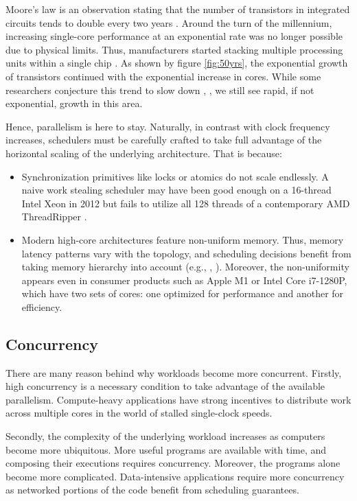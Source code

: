 \documentclass[12pt,a4paper,twoside]{report}
\begin{document}
Moore's law is an observation stating that the number of transistors in integrated circuits tends to double every two years \cite{Moore2006}. Around the turn of the millennium, increasing single-core performance at an exponential rate was no longer possible due to physical limits. Thus, manufacturers started stacking multiple processing units within a single chip \cite{Geer2005}. As shown by figure \ref{fig:50yrs}, the exponential growth of transistors continued with the exponential increase in cores. While some researchers conjecture this trend to slow down \cite{6307773}, \cite{mooremulti}, we still see rapid, if not exponential, growth in this area.

Hence, parallelism is here to stay. Naturally, in contrast with clock frequency increases, schedulers must be carefully crafted to take full advantage of the horizontal scaling of the underlying architecture. That is because:
\begin{itemize}
    \item Synchronization primitives like locks or atomics do not scale endlessly. A naive work stealing scheduler may have been good enough on a 16-thread Intel Xeon in 2012 but fails to utilize all 128 threads of a contemporary AMD ThreadRipper \cite{Castello2016}. 
    \item Modern high-core architectures feature non-uniform memory. Thus, memory latency patterns vary with the topology, and scheduling decisions benefit from taking memory hierarchy into account (e.g., \cite{Drebes2016}, \cite{faverge:inria-00416502}). Moreover, the non-uniformity appears even in consumer products such as Apple M1 or Intel Core i7-1280P, which have two sets of cores: one optimized for performance and another for efficiency.
\end{itemize}

\subsection{Concurrency}
\label{section:intr_software_conc}
There are many reason behind why workloads become more concurrent. Firstly, high concurrency is a necessary condition to take advantage of the available parallelism. Compute-heavy applications have strong incentives to distribute work across multiple cores in the world of stalled single-clock speeds. 

Secondly, the complexity of the underlying workload increases as computers become more ubiquitous. More useful programs are available with time, and composing their executions requires concurrency. Moreover, the programs alone become more complicated. Data-intensive applications \cite{Kleppmann2017-en} require more concurrency as networked portions of the code benefit from scheduling guarantees. 
\end{document}
